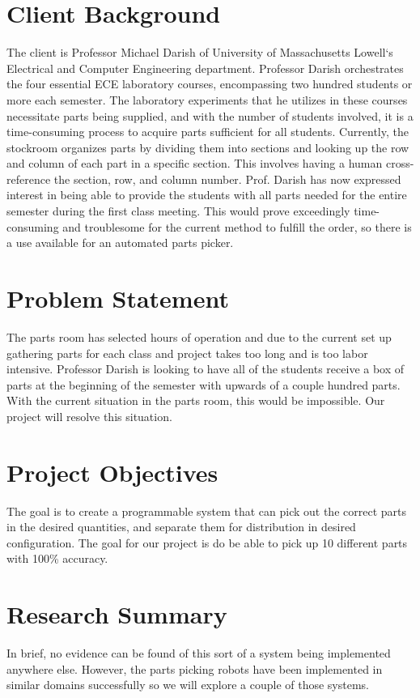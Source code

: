\documentclass[12pt]{report}
\begin{document}
\section*{Client Background}

The client is Professor Michael Darish of University of Massachusetts Lowell`s Electrical and Computer Engineering department.  Professor Darish orchestrates the four essential ECE laboratory courses, encompassing two hundred students or more each semester.  The laboratory experiments that he utilizes in these courses necessitate parts being supplied, and with the number of students involved, it is a time-consuming process to acquire parts sufficient for all students.  Currently, the stockroom organizes parts by dividing them into sections and looking up the row and column of each part in a specific section. This involves having a human cross-reference the section, row, and column number. Prof. Darish has now expressed interest in being able to provide the students with all parts needed for the entire semester during the first class meeting.  This would prove exceedingly time-consuming and troublesome for the current method to fulfill the order, so there is a use available for an automated parts picker.  

\section*{Problem Statement}

The parts room has selected hours of operation and due to the current set up gathering parts for each class and project takes too long and is too labor intensive. Professor Darish is looking to have all of the students receive a box of parts at the beginning of the semester with upwards of a couple hundred parts. With the current situation in the parts room, this would be impossible. Our project will resolve this situation. 

\section*{Project Objectives}

The goal is to create a programmable system that can pick out the correct parts in the desired quantities, and separate them for distribution in desired configuration.  The goal for our project is do be able to pick up 10 different parts with 100\% accuracy. 

\section*{Research Summary}
In brief, no evidence can be found of this sort of a system being implemented anywhere else. However, the parts picking robots have been implemented in similar domains successfully so we will explore a couple of those systems. 
	
\end{document}
